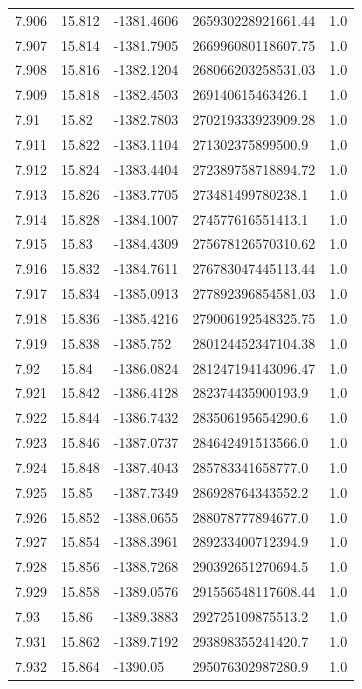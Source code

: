 \begin{tabular}{lllll}
7.906 & 15.812 & -1381.4606 & 265930228921661.44 & 1.0 \\
7.907 & 15.814 & -1381.7905 & 266996080118607.75 & 1.0 \\
7.908 & 15.816 & -1382.1204 & 268066203258531.03 & 1.0 \\
7.909 & 15.818 & -1382.4503 & 269140615463426.1 & 1.0 \\
7.91 & 15.82 & -1382.7803 & 270219333923909.28 & 1.0 \\
7.911 & 15.822 & -1383.1104 & 271302375899500.9 & 1.0 \\
7.912 & 15.824 & -1383.4404 & 272389758718894.72 & 1.0 \\
7.913 & 15.826 & -1383.7705 & 273481499780238.1 & 1.0 \\
7.914 & 15.828 & -1384.1007 & 274577616551413.1 & 1.0 \\
7.915 & 15.83 & -1384.4309 & 275678126570310.62 & 1.0 \\
7.916 & 15.832 & -1384.7611 & 276783047445113.44 & 1.0 \\
7.917 & 15.834 & -1385.0913 & 277892396854581.03 & 1.0 \\
7.918 & 15.836 & -1385.4216 & 279006192548325.75 & 1.0 \\
7.919 & 15.838 & -1385.752 & 280124452347104.38 & 1.0 \\
7.92 & 15.84 & -1386.0824 & 281247194143096.47 & 1.0 \\
7.921 & 15.842 & -1386.4128 & 282374435900193.9 & 1.0 \\
7.922 & 15.844 & -1386.7432 & 283506195654290.6 & 1.0 \\
7.923 & 15.846 & -1387.0737 & 284642491513566.0 & 1.0 \\
7.924 & 15.848 & -1387.4043 & 285783341658777.0 & 1.0 \\
7.925 & 15.85 & -1387.7349 & 286928764343552.2 & 1.0 \\
7.926 & 15.852 & -1388.0655 & 288078777894677.0 & 1.0 \\
7.927 & 15.854 & -1388.3961 & 289233400712394.9 & 1.0 \\
7.928 & 15.856 & -1388.7268 & 290392651270694.5 & 1.0 \\
7.929 & 15.858 & -1389.0576 & 291556548117608.44 & 1.0 \\
7.93 & 15.86 & -1389.3883 & 292725109875513.2 & 1.0 \\
7.931 & 15.862 & -1389.7192 & 293898355241420.7 & 1.0 \\
7.932 & 15.864 & -1390.05 & 295076302987280.9 & 1.0 \\

\end{tabular}
